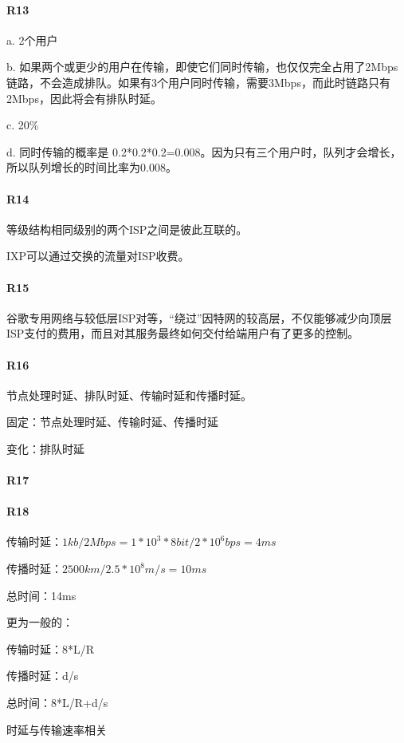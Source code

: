 \paragraph*{R13}
a. 2个用户

b. 如果两个或更少的用户在传输，即使它们同时传输，也仅仅完全占用了2Mbps链路，不会造成排队。如果有3个用户同时传输，需要3Mbps，而此时链路只有2Mbps，因此将会有排队时延。

c. 20\%

d. 同时传输的概率是 0.2*0.2*0.2=0.008。因为只有三个用户时，队列才会增长，所以队列增长的时间比率为0.008。

\paragraph*{R14}
等级结构相同级别的两个ISP之间是彼此互联的。

IXP可以通过交换的流量对ISP收费。

\paragraph*{R15}
谷歌专用网络与较低层ISP对等，“绕过”因特网的较高层，不仅能够减少向顶层ISP支付的费用，而且对其服务最终如何交付给端用户有了更多的控制。

\paragraph*{R16}
节点处理时延、排队时延、传输时延和传播时延。

固定：节点处理时延、传输时延、传播时延

变化：排队时延

\paragraph*{R17}

\paragraph*{R18}
传输时延：$1kb/2Mbps = 1*10^3*8 bit/2*10^6 bps = 4ms$

传播时延：$2500km/2.5*10^8m/s=10ms$

总时间：14ms

更为一般的：

传输时延：8*L/R

传播时延：d/s

总时间：8*L/R+d/s

时延与传输速率相关

